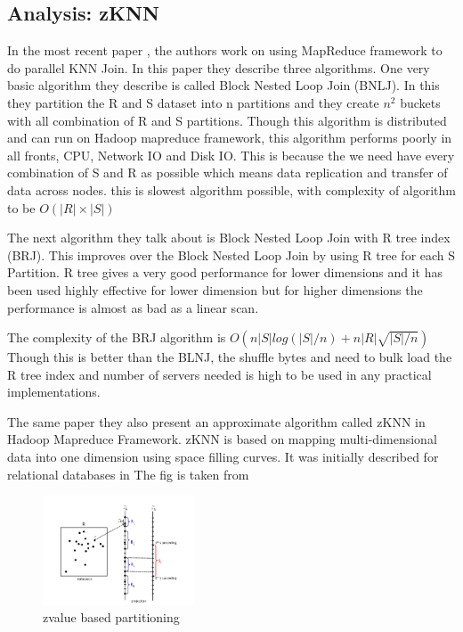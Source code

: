 \documentclass[conference]{IEEEtran}
\begin{document}
\bigskip
\subsection{Analysis: zKNN}
In the most recent paper \cite{zhang_efficient_2012}, the authors work on using
MapReduce framework to do parallel KNN Join. In this paper they
describe three algorithms. One very basic algorithm they describe is
called Block Nested Loop Join (BNLJ). In this they partition the R and S
dataset into n partitions and they create $n^2$ buckets
with all combination of R and S partitions. Though this algorithm is
distributed and can run on Hadoop mapreduce framework, this algorithm
performs poorly in all fronts, CPU, Network IO and Disk IO. This is
because the we need have every combination of S and R as possible
which means data replication and transfer of data across nodes. this
is slowest algorithm possible, with complexity of algorithm to be
$O(|R| \times |S|)$

\bigskip

The next algorithm they talk about is Block Nested Loop Join with R
tree index (BRJ). This improves over the Block Nested Loop Join by using R
tree for each S Partition. R tree gives a very good performance for
lower dimensions and it has been used highly effective for lower
dimension \cite{kuan_fast_1997} but for higher dimensions the
performance is almost as bad as a linear scan.

The complexity of the BRJ algorithm is $O(n|S|log(|S|/n) + n|R|\sqrt{|S|/n})$
Though this is better than the BLNJ,
the shuffle bytes and need to bulk load the R tree index and number of
servers needed is high to be used in any practical implementations.

\bigskip

The same paper they also present an approximate algorithm called zKNN
in Hadoop Mapreduce Framework. zKNN is based on mapping
multi-dimensional data into one dimension using space filling
curves. It was initially described for relational databases in \cite{yao_k_2010}
The fig is taken from \cite{song_solutions_2015}

\begin{figure}[here]
\includegraphics[width=0.4\textwidth]{zknn.png}
\caption{zvalue based partitioning}
\label{fig:zknn.png}
\end{figure}
\end{document}
